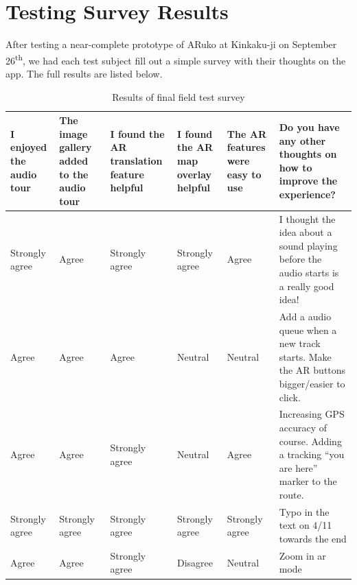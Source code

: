 \documentclass[a4paper, 10pt, american, titlepage]{article}
\begin{document}
\clearpage

\section{Testing Survey Results}
\label{sec:testingSurveyResults}

After testing a near-complete prototype of ARuko at Kinkaku-ji on September
26\textsuperscript{th}, we had each test subject fill out a simple survey with
their thoughts on the app. The full results are listed below.


\begin{table}[h]
\begin{singlespace}
\begin{tabulary}{\textwidth}{ L | L | L | L | L | L }
	I enjoyed the audio tour & The image gallery added to the audio tour & I
	found the AR translation feature helpful & I found the AR map overlay
	helpful & The AR features were easy to use & Do you have any other thoughts
	on how to improve the experience? \\
	\hline

	Strongly agree & Agree & Strongly agree & Strongly agree & Agree & I thought
	the idea about a sound playing before the audio starts is a really good
	idea! \\

	Agree & Agree & Agree & Neutral & Neutral & Add a audio queue when a new
	track starts. Make the AR buttons bigger/easier to click. \\

	Agree & Agree & Strongly agree & Neutral & Agree & Increasing GPS accuracy
	of course. Adding a tracking ``you are here'' marker to the route. \\

	Strongly agree & Strongly agree & Strongly agree & Strongly agree & Strongly
	agree & Typo in the text on 4/11 towards the end \\

	Agree & Agree & Strongly agree & Disagree & Neutral & Zoom in ar mode \\
\end{tabulary}
\end{singlespace}
\caption{Results of final field test survey}
\label{tab:testingSurveyResults}
\end{table}
\end{document}
